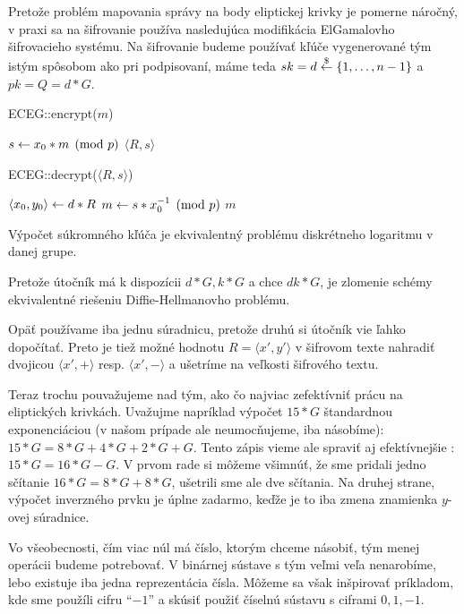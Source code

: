 Pretože problém mapovania správy na body eliptickej krivky je pomerne
náročný, v praxi sa na šifrovanie používa nasledujúca modifikácia
ElGamalovho šifrovacieho systému. Na šifrovanie budeme používať
kľúče vygenerované tým istým spôsobom ako pri podpisovaní, máme teda
$sk=d \overset{\$}{\leftarrow} \{1,\dots,n-1\}$ a $pk=Q=d*G$.

\begin{procedure}[H]
    \caption{ECEG::encrypt($m$)}
    $ s \leftarrow x_0 * m \pmod{p}$ \;
    \Return $\langle R, s \rangle$ \;
\end{procedure}

\begin{procedure}[H]
    \caption{ECEG::decrypt($\langle R, s\rangle$)}
    $\langle x_0, y_0 \rangle \leftarrow d*R$ \;
    $ m \leftarrow  s * x_0^{-1} \pmod{p}$ \;
    \Return $m$ \;
\end{procedure}

\begin{poznamka}
    Výpočet súkromného kľúča je ekvivalentný problému diskrétneho
    logaritmu v danej grupe.
\end{poznamka}
\begin{poznamka}
    Pretože útočník má k dispozícii $d*G, k*G$ a chce $dk*G$, je
    zlomenie schémy ekvivalentné riešeniu Diffie-Hellmanovho problému.
\end{poznamka}
\begin{poznamka}
    Opäť používame iba jednu súradnicu, pretože druhú si útočník vie
    ľahko dopočítať. Preto je tiež možné hodnotu
    $R = \langle x', y' \rangle$ v šifrovom texte nahradiť dvojicou
    $\langle x', + \rangle$ resp. $\langle x', - \rangle$
    a ušetríme na veľkosti šifrového textu.
\end{poznamka}

Teraz trochu pouvažujeme nad tým, ako čo najviac zefektívniť prácu na
eliptických krivkách. Uvažujme napríklad výpočet $15*G$ štandardnou
exponenciáciou (v našom prípade ale neumocňujeme, iba násobíme):
$15*G = 8*G + 4*G + 2*G + G$. Tento zápis vieme ale spraviť aj
efektívnejšie : $15*G = 16*G - G$. V prvom rade si môžeme všimnúť, že
sme pridali jedno sčítanie $16*G = 8*G + 8*G$, ušetrili sme ale dve
sčítania. Na druhej strane, výpočet inverzného prvku je úplne zadarmo,
keďže je to iba zmena znamienka $y$-ovej súradnice.

Vo všeobecnosti, čím viac núl má číslo, ktorým chceme
násobiť, tým menej operácii budeme potrebovať. V binárnej sústave s
tým veľmi veľa nenarobíme, lebo existuje iba jedna reprezentácia
čísla. Môžeme sa však inšpirovať príkladom, kde sme použíli cifru
``$-1$'' a skúsiť použiť číselnú sústavu s ciframi $0,1,-1$.

